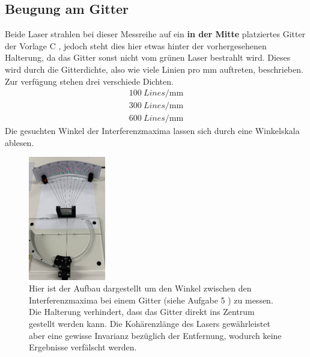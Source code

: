 \subsection{Beugung am Gitter}
Beide Laser strahlen bei dieser Messreihe auf ein \textbf{in der Mitte} platziertes Gitter der Vorlage C \cite{skript}, jedoch steht dies hier etwas hinter der vorhergesehenen Halterung, da das Gitter sonst nicht vom grünen Laser bestrahlt wird. Dieses wird durch die Gitterdichte, also wie viele
Linien pro $\si{\milli\meter}$ auftreten, beschrieben. Zur verfügung stehen drei verschiede Dichten. 
\begin{align*}
    \SI{100}{Lines \per \milli\meter} \\
    \SI{300}{Lines \per \milli\meter} \\
    \SI{600}{Lines \per \milli\meter} 
\end{align*}
Die gesuchten Winkel der Interferenzmaxima lassen sich durch eine Winkelskala ablesen.
    \begin{figure}
        \centering
        \includegraphics[width=0.3\textwidth]{bilder/gitter.png}
        \caption{Hier ist der Aufbau dargestellt um den Winkel zwischen den Interferenzmaxima bei einem Gitter
        (siehe Aufgabe 5 \cite{skript}) zu messen. Die Halterung verhindert, dass das Gitter direkt ins Zentrum gestellt werden kann.
        Die Kohärenzlänge des Lasers gewährleistet aber eine gewisse Invarianz bezüglich der Entfernung, wodurch keine Ergebnisse verfälscht werden.}
\end{figure}




